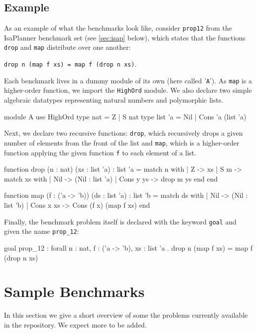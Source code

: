 \documentclass{llncs}
\begin{document}
\subsection*{Example}
As an example of what the benchmarks look like, consider \texttt{prop12} from the IsaPlanner benchmark set (see \ref{sec:isap} below), which states that the functions \texttt{drop} and \texttt{map} distribute over one another: \begin{center} \texttt{drop n (map f xs) = map f (drop n xs)}.\end{center}
Each benchmark lives in a dummy module of its own (here called '\texttt{A}'). As \texttt{map} is a higher-order function, we import the \texttt{HighOrd} module. We also declare two simple algebraic datatypes representing natural numbers and polymorphic lists.

\begin{code}
module A
  use HighOrd
  type nat = Z | S nat
  type list 'a = Nil | Cons 'a (list 'a)
\end{code}

Next, we declare two recursive functions: \texttt{drop}, which recursively drops a given number of elements from the front of the list and \texttt{map}, which is a higher-order function applying the given function \texttt{f} to each element of a list.

\begin{code}
function drop (n : nat) (xs : list 'a) : list 'a =
match n with
	| Z -> xs
	| S m ->
		match xs with
		| Nil -> (Nil : list 'a)
		| Cons y ys -> drop m ys
	end
end

function map (f : ('a -> 'b)) (ds : list 'a) : list 'b =
match ds with
	| Nil -> (Nil : list 'b)
	| Cons x xs -> Cons (f x) (map f xs)
end
\end{code}

Finally, the benchmark problem itself is declared with the keyword \texttt{goal} and given the name \texttt{prop\_12}:

\begin{code}
goal prop_12 :
  forall n : nat, f : ('a -> 'b), xs : list 'a .
  drop n (map f xs) = map f (drop n xs)
\end{code}

\section{Sample Benchmarks}
In this section we give a short overview of  some the problems currently available in the repository. We expect more to be added.
\end{document}
